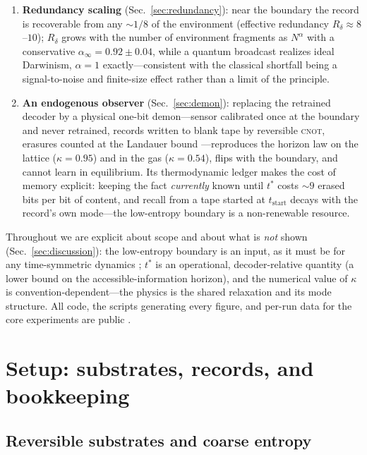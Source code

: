\documentclass[aps,pre,twocolumn,superscriptaddress,nofootinbib,longbibliography]{revtex4-2}
\newcommand{\tstar}{t^{*}}
\newcommand{\kap}{\kappa}
\begin{document}
\begin{enumerate}
\item \textbf{Redundancy scaling} (Sec.~\ref{sec:redundancy}): near the boundary the record
is recoverable from any $\sim1/8$ of the environment (effective redundancy
$R_\delta\approx8$--$10$); $R_\delta$ grows with the number of environment fragments as
$N^{\alpha}$ with a conservative $\alpha_\infty=0.92\pm0.04$, while a quantum broadcast
realizes ideal Darwinism, $\alpha=1$ exactly---consistent with the classical shortfall
being a signal-to-noise and finite-size effect rather than a limit of the principle.
\item \textbf{An endogenous observer} (Sec.~\ref{sec:demon}): replacing the retrained
decoder by a physical one-bit demon---sensor calibrated once at the boundary and never
retrained, records written to blank tape by reversible \textsc{cnot}, erasures counted at
the Landauer bound \cite{szilard1929,landauer1961,bennett1982,parrondo2015}---reproduces
the horizon law on the lattice ($\kap=0.95$) and in the gas ($\kap=0.54$), flips with the
boundary, and cannot learn in equilibrium. Its thermodynamic ledger makes the cost of
memory explicit: keeping the fact \emph{currently} known until $\tstar$ costs $\sim9$
erased bits per bit of content, and recall from a tape started at $t_{\mathrm{start}}$
decays with the record's own mode---the low-entropy boundary is a non-renewable resource.
\end{enumerate}

Throughout we are explicit about scope and about what is \emph{not} shown
(Sec.~\ref{sec:discussion}): the low-entropy boundary is an input, as it must be for any
time-symmetric dynamics \cite{loschmidt1876}; $\tstar$ is an operational,
decoder-relative quantity (a lower bound on the accessible-information horizon), and the
numerical value of $\kap$ is convention-dependent---the physics is the shared relaxation
and its mode structure. All code, the scripts generating every figure, and per-run data
for the core experiments are public \cite{repo}.

\section{Setup: substrates, records, and bookkeeping}
\label{sec:setup}

\subsection{Reversible substrates and coarse entropy}
\end{document}
